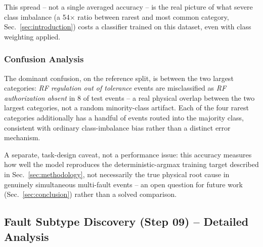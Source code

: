 This spread -- not a single averaged accuracy -- is the real picture of what severe class imbalance (a 54$\times$ ratio between rarest and most common category, Sec.~\ref{sec:introduction}) costs a classifier trained on this dataset, even with class weighting applied. %

\subsubsection{Confusion Analysis}

The dominant confusion, on the reference split, is between the two largest categories: \textit{RF regulation out of tolerance} events are misclassified as \textit{RF authorization absent} in 8 of \MetricZeroEightPhaseThreeaRootcauseNTest{} %
test events -- a real physical overlap between the two largest categories, not a random minority-class artifact. Each of the four rarest categories additionally has a handful of events routed into the majority class, consistent with ordinary class-imbalance bias rather than a distinct error mechanism.

A separate, task-design caveat, not a performance issue: this accuracy measures how well the model reproduces the deterministic-argmax training target described in Sec.~\ref{sec:methodology}, not necessarily the true physical root cause in genuinely simultaneous multi-fault events -- an open question for future work (Sec.~\ref{sec:conclusion}) rather than a solved comparison.

\subsection{Fault Subtype Discovery (Step 09) -- Detailed Analysis} %

